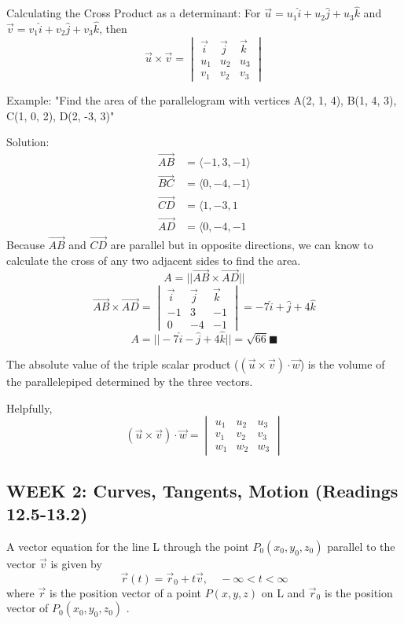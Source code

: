 \documentclass[12pt]{article}
\begin{document}
Calculating the Cross Product as a determinant:
For $\vec{u} = u_1 \hat{i} + u_2 \hat{j} + u_3 \hat{k}$ and $\vec{v} = v_1 \hat{i} + v_2 \hat{j} + v_3 \hat{k}$, then 
$$\vec{u} \times \vec{v} = \begin{vmatrix}
    \vec{i} & \vec{j} & \vec{k}\\
    u_1 & u_2 & u_3\\
    v_1 & v_2 & v_3
\end{vmatrix}$$

Example:
"Find the area of the parallelogram with vertices A(2, 1, 4), B(1, 4, 3), C(1, 0, 2), D(2, -3, 3)"

Solution:
\begin{align*}
    \vec{AB} &= \langle -1, 3, -1\rangle\\
    \vec{BC} &= \langle 0, -4, -1\rangle\\
    \vec{CD} &= \langle 1, -3, 1\\
    \vec{AD} &= \langle 0, -4, -1
\end{align*}
Because $\vec{AB}$ and $\vec{CD}$ are parallel but in opposite directions, we can know to calculate the cross of any two adjacent sides to find the area. 
$$A = ||\vec{AB} \times \vec{AD}||$$
$$\vec{AB} \times \vec{AD} = \begin{vmatrix}
    \vec{i} & \vec{j} & \vec{k}\\
    -1 & 3 & -1\\
    0 & -4 & -1
\end{vmatrix} = -7\hat{i} + \hat{j} + 4\hat{k}$$
$$A = ||-7\hat{i} - \hat{j} + 4\hat{k}|| = \sqrt{66} \blacksquare$$

The absolute value of the triple scalar product ($(\vec{u}\times \vec{v}) \cdot \vec{w}$) is the volume of the parallelepiped determined by the three vectors.

Helpfully, 
$$(\vec{u}\times \vec{v}) \cdot \vec{w} = \begin{vmatrix}
    u_1 & u_2 & u_3\\
    v_1 & v_2 & v_3\\
    w_1 & w_2 & w_3
\end{vmatrix}$$


\subsection{WEEK 2: Curves, Tangents, Motion (Readings 12.5-13.2)}
A vector equation for the line L through the point $P_0 (x_0, y_0, z_0)$ parallel to the vector $\vec{v}$ is given by 
$$\vec{r}(t) = \vec{r}_0 + t \vec{v}, \quad -\infty < t < \infty$$
where $\vec{r}$ is the position vector of a point $P(x,y,z)$ on L and $\vec{r}_0$ is the position vector of  $P_0 (x_0, y_0, z_0)$ .
\end{document}
